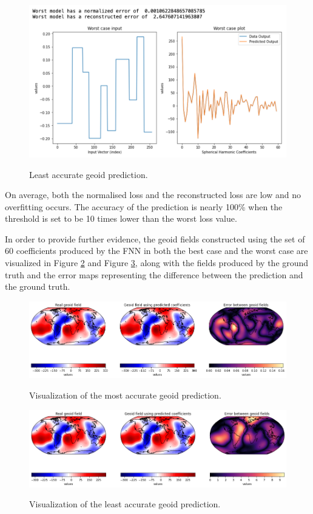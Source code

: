\begin{figure}[H]
    \caption{Least accurate geoid prediction.}
    \includegraphics[scale=0.6]{figures/geoid_images/Geoid_Worst.png}
    \label{figure:geoid_worst}
\end{figure}

On average, both the normalised loss and the reconstructed loss are low and no overfitting occurs. The accuracy of the prediction is nearly 100\% when the threshold is set to be 10 times lower than the worst loss value. 

In order to provide further evidence, the geoid fields constructed using the set of 60 coefficients produced by the FNN in both the best case and the worst case are visualized in Figure \ref{figure:geoid_best_visual} and Figure \ref{figure:geoid_worst_visual}, along with the fields produced by the ground truth and the error maps representing the difference between the prediction and the ground truth.

\begin{figure}[H]
    \caption{Visualization of the most accurate geoid prediction.}
    \includegraphics[scale=0.4]{figures/geoid_images/Geoid_Best_visualization.png}
    \label{figure:geoid_best_visual}
\end{figure}

\begin{figure}[H]
    \caption{Visualization of the least accurate geoid prediction.}
    \includegraphics[scale=0.4]{figures/geoid_images/Geoid_Worst_visualization.png}
    \label{figure:geoid_worst_visual}
\end{figure}

